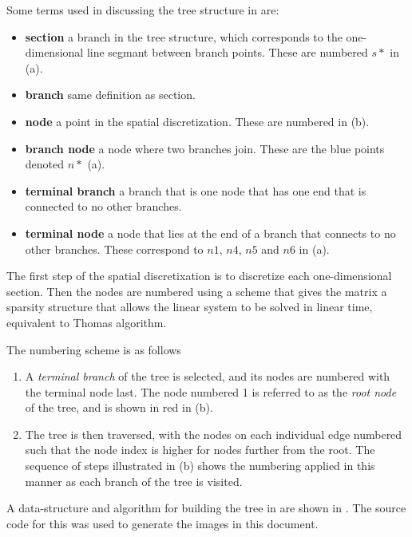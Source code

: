 Some terms used in discussing the tree structure in  are:
\begin{itemize}
        \item \textbf{section} a branch in the tree structure, which corresponds to the one-dimensional line segmant between branch points. These are numbered $s*$ in (a).
        \item \textbf{branch} same definition as section.
        \item \textbf{node} a point in the spatial discretization. These are numbered in (b).
        \item \textbf{branch node} a node where two branches join. These are the blue points denoted $n*$ (a).
        \item \textbf{terminal branch} a branch that is one node that has one end that is connected to no other branches.
        \item \textbf{terminal node} a node that lies at the end of a branch that connects to no other branches. These correspond to $n1$, $n4$, $n5$ and $n6$ in (a).
\end{itemize}

The first step of the spatial discretixation is to discretize each one-dimensional section. Then the nodes are numbered using a scheme that gives the matrix a sparsity structure that allows the linear system to be solved in linear time, equivalent to Thomas algorithm.

The numbering scheme is as follows
\begin{enumerate}
\item
    A \emph{terminal branch} of the tree is selected, and its nodes are numbered with the terminal node last.
    The node numbered 1 is referred to as the \emph{root node} of the tree, and is shown in red in (b).
\item
    The tree is then traversed, with the nodes on each individual edge numbered such that the node index is higher for nodes further from the root. The sequence of steps illustrated in (b) shows the numbering applied in this manner as each branch of the tree is visited.
\end{enumerate}
A data-structure and algorithm for building the tree in  are shown in . The source code for this was used to generate the images in this document.

